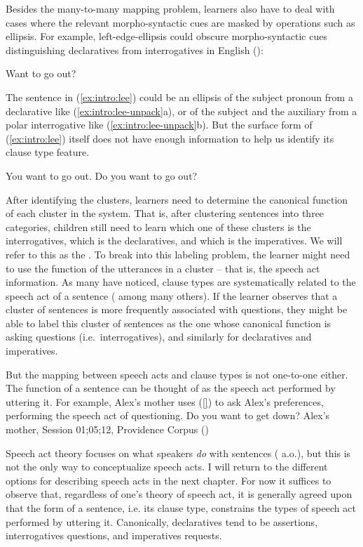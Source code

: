 {Besides the many-to-many mapping problem, learners also have to deal with cases where the relevant morpho-syntactic cues are masked by operations such as ellipsis.  For example, left-edge-ellipsis could obscure morpho-syntactic cues distinguishing declaratives from interrogatives in English (\cite{zwickypullum1983leftedge}):

Want to go out?
\eex

The sentence in (\ref{ex:intro:lee}) could be an ellipsis of  the subject pronoun from a declarative like (\ref{ex:intro:lee-unpack}a), or of the subject and the auxiliary from a polar interrogative like (\ref{ex:intro:lee-unpack}b). But the surface form of (\ref{ex:intro:lee}) itself does not have enough information to help us identify its clause type feature. 

\bxl
You want to go out.
\ex Do you want to go out?
\exl
\eex


%

After identifying the clusters, learners need to determine the canonical function of each cluster in the system. That is, after clustering sentences into three categories, children still need to learn which one of these clusters is the interrogatives, which is the declaratives, and which is the imperatives. We will refer to this as the . To break into this labeling problem, the learner might need to use the function of the utterances in a cluster -- that is, the speech act information. As many have noticed, clause types are systematically related to the speech act of a sentence (\cite{katzpostal1964, sz1985speechact, portner2018} among many others). If the learner observes that a cluster of sentences is more frequently associated with questions, they might be able to label this cluster of sentences as the one whose canonical function is asking questions (i.e.\ interrogatives), and similarly for declaratives and imperatives. 

But the mapping between speech acts and clause types is not one-to-one either. The function of a sentence can be thought of as the speech act performed by uttering it. For example, Alex's mother uses (\ref{}) to ask Alex's preferences, performing the speech act of questioning.
\bex{}
Do you want to get down? \hfill Alex's mother, Session 01;05;12, Providence Corpus (\cite{ProvidenceCorpus})
\eex

Speech act theory focuses on what speakers \emph{do} with sentences (\cite{austin1975things, searle1969} a.o.), but this is not the only way to conceptualize speech acts. I will return to the different options for describing speech acts in the next chapter. For now it suffices to observe that, regardless of one's theory of speech act, it is generally agreed upon that the form of a sentence, i.e. its clause type, constrains the types of speech act performed by uttering it. Canonically, declaratives tend to be assertions, interrogatives questions, and imperatives requests. 


}
